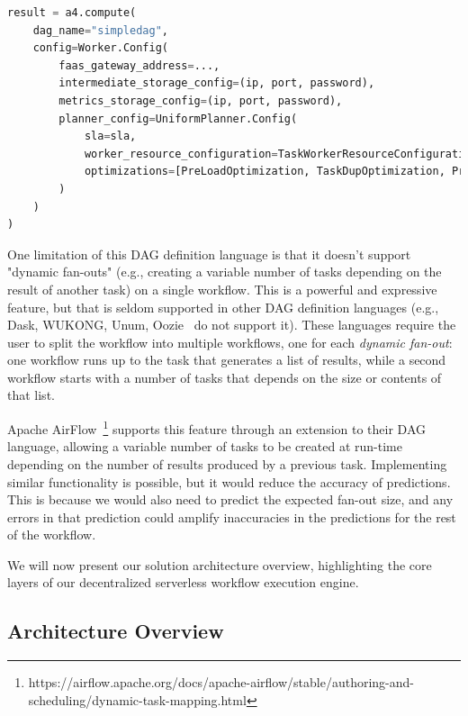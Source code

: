 \documentclass[conference]{IEEEtran}
\begin{document}
\begin{lstlisting}[language=Python, basicstyle=\ttfamily\footnotesize, columns=fullflexible, breaklines=true, caption=Setting up and launching workflow execution, label=lst:setup_and_launch_workflow_execution]
result = a4.compute(
    dag_name="simpledag", 
    config=Worker.Config(
        faas_gateway_address=...,
        intermediate_storage_config=(ip, port, password),
        metrics_storage_config=(ip, port, password),
        planner_config=UniformPlanner.Config(
            sla=sla,
            worker_resource_configuration=TaskWorkerResourceConfiguration(cpus=3, memory_mb=512),
            optimizations=[PreLoadOptimization, TaskDupOptimization, PreWarmOptimization]
        )
    )
)
\end{lstlisting}

One limitation of this DAG definition language is that it doesn't support "dynamic fan-outs" (e.g., creating a variable number of tasks depending on the result of another task) on a single workflow. This is a powerful and expressive feature, but that is seldom supported in other DAG definition languages (e.g., Dask, WUKONG, Unum, Oozie~\cite{apache_oozie} do not support it). These languages require the user to split the workflow into multiple workflows, one for each \textit{dynamic fan-out}: one workflow runs up to the task that generates a list of results, while a second workflow starts with a number of tasks that depends on the size or contents of that list. 

Apache AirFlow~\footnote{https://airflow.apache.org/docs/apache-airflow/stable/authoring-and-scheduling/dynamic-task-mapping.html} supports this feature through an extension to their DAG language, allowing a variable number of tasks to be created at run-time depending on the number of results produced by a previous task. Implementing similar functionality is possible, but it would reduce the accuracy of predictions. This is because we would also need to predict the expected fan-out size, and any errors in that prediction could amplify inaccuracies in the predictions for the rest of the workflow.

We will now present our solution architecture overview, highlighting the core layers of our decentralized serverless workflow execution engine.

\subsection{Architecture Overview}
\end{document}
